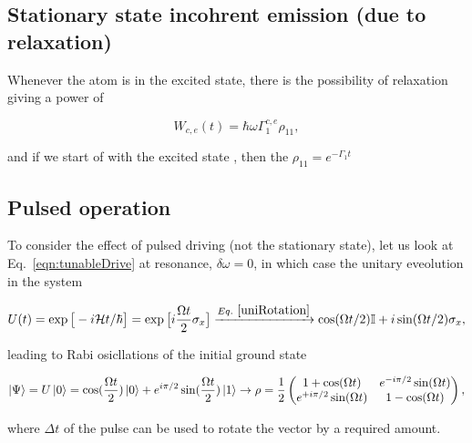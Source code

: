  \subsection{Stationary state incohrent emission (due to relaxation)}
 	 Whenever the atom is in the excited state, there is the possibility of relaxation giving a power of
 	
 	\[
 		W_{c,e}(t) = \hbar\omega \Gamma_1^{c,e}\rho_{11},
 	\]
 	
 	\noindent and if we start of with the excited state , then the $ \rho_{11} = e^{-\Gamma_1t} $
	
\newpage
 \subsection{Pulsed operation\label{subsec:pulsedOperation}}
  {\color{black!80} To consider the effect of pulsed driving (not the stationary state), let us look at Eq.~\eqref{eqn:tunableDrive} at resonance, $ \delta\omega = 0 $, in which case the unitary eveolution in the system
  	
  	\[
  	U(t) = \exp\big[-i\mathcal{H}t/\hbar\big] = \exp\big[i\frac{\Omega t}{2}\sigma_x\big] \xrightarrow{Eq.~\eqref{uniRotation}} \cos(\Omega t/2)\mathbb{I} + i\sin(\Omega t/2)\sigma_x,
  	\]
  	
  	\noindent leading to Rabi osicllations of the initial ground state
  	
  	\begin{equation}\label{eqn:drivingExample}
  	\ket{\Psi} = U\ket{0} = \cos(\frac{\Omega t}{2})\ket{0}+e^{i\pi/2}\sin(\frac{\Omega t}{2})\ket{1} \rightarrow 
  	\rho = \frac{1}{2}\begin{pmatrix}
  	1+\cos(\Omega t) & e^{-i\pi/2}\sin(\Omega t)\\ e^{+i\pi/2}\sin(\Omega t) & 1-\cos(\Omega t)
  	\end{pmatrix},
  	\end{equation}
  }
  \noindent where $ \Delta t $ of the pulse can be used to rotate the vector by a required amount. 
  

